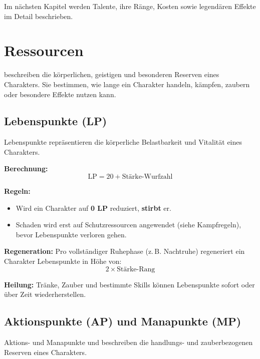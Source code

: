 Im nächsten Kapitel werden Talente, ihre Ränge, Kosten sowie legendären
Effekte im Detail beschrieben.

\section{Ressourcen}

 beschreiben die körperlichen, geistigen und besonderen Reserven
eines Charakters. Sie bestimmen, wie lange ein Charakter handeln, kämpfen,
zaubern oder besondere Effekte nutzen kann.

\subsection*{Lebenspunkte (LP)}

\begin{rulebox}{Lebenspunkte}
	 repräsentieren die körperliche Belastbarkeit und
	Vitalität eines Charakters.
\end{rulebox}

\textbf{Berechnung:}
\[
\text{LP} = 20 + \text{Stärke-Wurfzahl}
\]

\textbf{Regeln:}
\begin{itemize}
	\item Wird ein Charakter auf \textbf{0 LP} reduziert, \textbf{stirbt} er.
	\item Schaden wird erst auf Schutzressourcen angewendet
	(siehe Kampfregeln), bevor Lebenspunkte verloren gehen.
\end{itemize}

\textbf{Regeneration:}  
Pro vollständiger Ruhephase (z.\,B. Nachtruhe) regeneriert ein Charakter
Lebenspunkte in Höhe von:
\[
2 \times \text{Stärke-Rang}
\]

\textbf{Heilung:}  
Tränke, Zauber und bestimmte Skills können Lebenspunkte sofort oder über Zeit
wiederherstellen.

\subsection*{Aktionspunkte (AP) und Manapunkte (MP)}

\begin{rulebox}{Aktions- und Manapunkte}
	 und  beschreiben die
	handlungs- und zauberbezogenen Reserven eines Charakters.
\end{rulebox}

